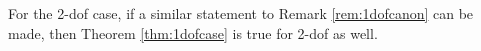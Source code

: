 


\begin{observation*}
\label{obs:2dof_case}
    For the 2-dof case, if a similar statement to Remark \ref{rem:1dofcanon} can be made, then Theorem \ref{thm:1dofcase} is true for 2-dof as well.
\end{observation*}





